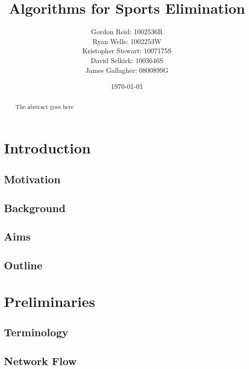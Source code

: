 \documentclass{l3proj}
\begin{document}
\title{Algorithms for Sports Elimination}
\author{
    Gordon Reid: 1002536R\\
    Ryan Wells: 1002253W\\
    Kristopher Stewart: 1007175S\\
    David Selkirk: 1003646S\\
    James Gallagher: 0800899G\\
}\date{\today}
\maketitle
\begin{abstract}

The abstract goes here

\end{abstract}
\educationalconsent
\tableofcontents
\chapter{Introduction}
\label{intro}

\section{Motivation}

\section{Background}

\section{Aims}

\section{Outline}

\chapter{Preliminaries}

\section{Terminology}

\section{Network Flow}
\end{document}
